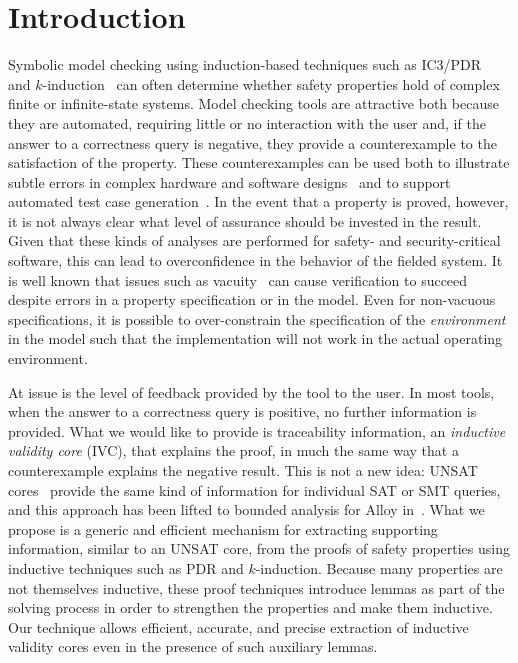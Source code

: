 \section{Introduction}
\label{sec:intro}


Symbolic model checking using induction-based techniques such as IC3/PDR~\cite{Een2011:PDR} and $k$-induction~\cite{SheeranSS00} can often determine whether safety properties hold of complex finite or infinite-state systems.  Model checking tools are attractive both because they are automated, requiring little or no interaction with the user and, if the answer to a correctness query is negative, they provide a counterexample to the satisfaction of the property.  These counterexamples can be used both to illustrate subtle errors in complex hardware and software designs~\cite{hilt2013,McMillan99:compositional, Miller10:CACM} and to support automated test case generation~\cite{Whalen13:OMCDC, You15:dse}.
In the event that a property is proved, however, it is not always clear what level of assurance should be invested in the result.  Given that these kinds of analyses are performed for safety- and security-critical software, this can lead to overconfidence in the behavior of the fielded system.  It is well known that issues such as vacuity~\cite{Kupferman03:Vacuity} can cause verification to succeed despite errors in a property specification or in the model. Even for non-vacuous specifications, it is possible to over-constrain the specification of the {\em environment} in the model such that the implementation will not work in the actual operating environment.

At issue is the level of feedback provided by the tool to the user. In
most tools, when the answer to a correctness query is positive, no
further information is provided. What we would like to provide is
traceability information, an {\em inductive validity core} (IVC), that explains
the proof, in much the same way that a counterexample explains the
negative result. This is not a new idea: UNSAT cores~\cite{zhang2003extracting}
provide the same kind of information for individual SAT or
SMT queries, and this approach has been lifted to bounded analysis
for Alloy in~\cite{Torlak08:cores}. What we propose is a generic and efficient
mechanism for extracting supporting information, similar to an UNSAT
core, from the proofs of safety properties using inductive techniques
such as PDR and $k$-induction. Because many
properties are not themselves inductive, these proof techniques
introduce lemmas as part of the solving process in order to strengthen
the properties and make them inductive. Our technique allows
efficient, accurate, and precise extraction of inductive validity cores
even in the presence of such auxiliary lemmas.

